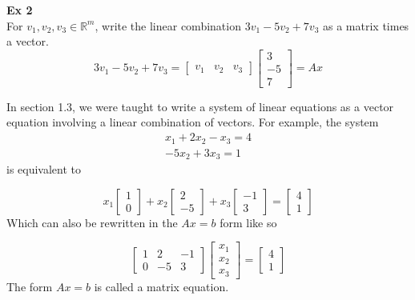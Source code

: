 \documentclass{article}
\begin{document}
  \textbf{Ex 2}\\
  For $ v_{1},v_{2},v_{3} \in \mathbb{R}^{m}$, write the linear combination $ 3v_{1}-5v_{2}+7v_{3}$ as a matrix times a vector.
  \[
    3v_{1}-5v_{2}+7v_{3}=
    \begin{bmatrix}
      v_{1} &v_{2} &v_{3} 
    \end{bmatrix}
    \begin{bmatrix}
      3\\
      -5\\
      7
    \end{bmatrix}=Ax
  \]

  In section 1.3, we were taught to write a system of linear equations as a vector equation involving a linear combination of vectors. For example, the system
  \[
    \begin{gathered}
    x_{1}+2x_{2}-x_{3}=4\\
    -5x_{2}+3x_{3}=1     
    \end{gathered}
  \]
  is equivalent to

  \[
    x_{1}\begin{bmatrix}
      1\\
      0
    \end{bmatrix} +
    x_{2} \begin{bmatrix}
      2\\
      -5
    \end{bmatrix} +
    x_{3}\begin{bmatrix}
      -1\\
      3
    \end{bmatrix}=
    \begin{bmatrix}
      4\\
      1
    \end{bmatrix}
  \]
  Which can also be rewritten in the $ Ax=b $ form like so

  \[
    \begin{bmatrix}
      1 &2 &-1\\
      0 &-5 &3
    \end{bmatrix}
    \begin{bmatrix}
      x_{1} \\
      x_{2} \\
      x_{3} 
    \end{bmatrix} =
    \begin{bmatrix}
      4\\
      1
    \end{bmatrix}
  \]
  The form $ Ax=b $ is called a matrix equation.
\end{document}
